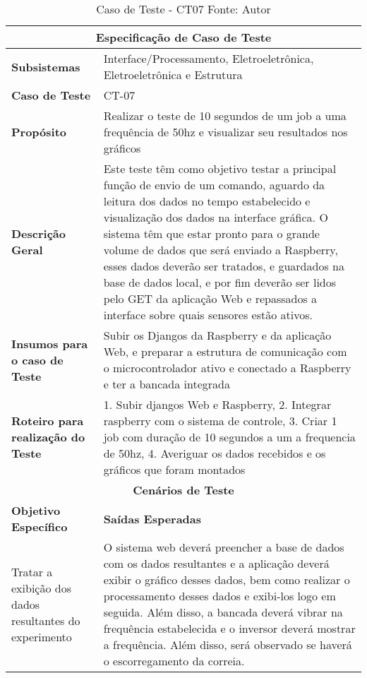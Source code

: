\begin{table}[H]
    \begin{center}
        \begin{tabular}{|p{5cm}|p{12cm}|}
            \hline
            \multicolumn{2}{|c|}{\textbf{Especificação de Caso de Teste}} \\ \hline
                \textbf{Subsistemas}                               &  Interface/Processamento, Eletroeletrônica, Eletroeletrônica e Estrutura \\ \hline
                \textbf{Caso de Teste}                             & CT-07 \\ \hline
                \textbf{Propósito}                                     & Realizar o teste de 10 segundos de um job a uma frequência de 50hz e visualizar seu resultados nos gráficos \\ \hline
                \textbf{Descrição Geral}                           & Este teste têm como objetivo testar a principal função de envio de um comando, aguardo da leitura dos dados no tempo estabelecido e visualização dos dados na interface gráfica. O sistema têm que estar pronto para o grande volume de dados que será enviado a Raspberry, esses dados deverão ser tratados, e guardados na base de dados local, e por fim deverão ser lidos pelo GET da aplicação Web e repassados a interface sobre quais sensores estão ativos. \\ \hline
                \textbf{Insumos para o caso de Teste}    & Subir os Djangos da Raspberry e da aplicação Web, e preparar a estrutura de comunicação com o microcontrolador ativo e conectado a Raspberry e ter a bancada integrada\\ \hline
                \textbf{Roteiro para realização do Teste}&  1. Subir djangos Web e Raspberry, 2. Integrar raspberry com o sistema de controle, 3. Criar 1 job com duração de 10 segundos a um a frequencia de 50hz, 4. Averiguar os dados recebidos e os gráficos que foram montados  \\ \hline
            \multicolumn{2}{|c|}{\textbf{Cenários de Teste}} \\ \hline
                \textbf{Objetivo Específico}                      & \textbf{Saídas Esperadas} \\ \hline
                Tratar a exibição dos dados resultantes do experimento & O sistema web deverá preencher a base de dados com os dados resultantes e a aplicação deverá exibir o gráfico desses dados, bem como realizar o processamento desses dados e exibi-los logo em seguida.  Além disso, a bancada deverá vibrar na frequência estabelecida e o inversor deverá mostrar a frequência. Além disso, será observado se haverá o escorregamento da correia. \\ \hline
        \end{tabular}
    \end{center}
    \caption[Caso de Teste - CT07]{Caso de Teste - CT07
    \protect Fonte: Autor}
    \label{CT-07}
\end{table}

